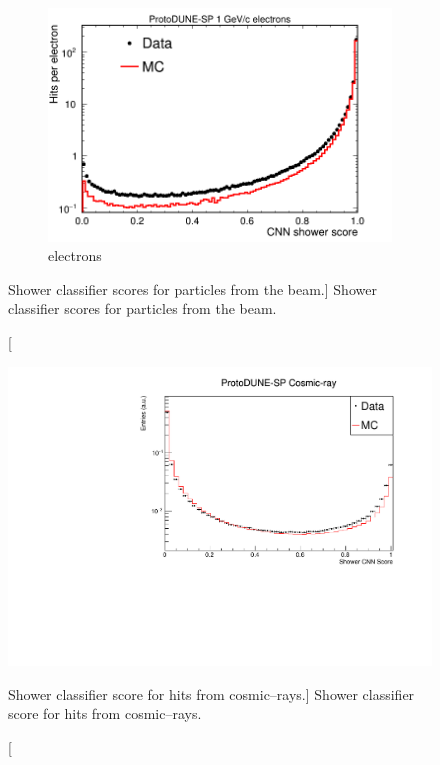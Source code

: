 \begin{figure}
	\begin{subfigure}[b]{0.7\textwidth}
		\centering
		\includegraphics[width=\textwidth]{figures/beam_electron_cnn.png}
		\caption {electrons}
		\label{fig:beam_electron_cnn}
	\end{subfigure}

	\caption
	[Shower classifier scores for particles from the \protodune{} beam.]
	{ Shower classifier scores for particles from the \protodune{} beam. }

	\label{fig:cnn_scores_beam}

\end{figure}

\begin{figure}
	\centering
	\includegraphics[width=\textwidth]{figures/hit_cnn_cosmics.pdf}
	\caption
	[Shower classifier score for hits from cosmic--rays.]
	{Shower classifier score for hits from cosmic--rays.}
	\label{fig:cosmic_muon_cnn}
\end{figure}

